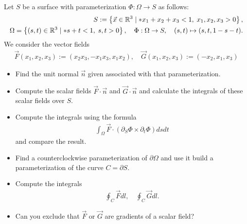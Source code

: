 \documentclass[11pt]{article}
\begin{document}
\begin{exercise}
    Let $S$ be a surface with parameterization $\Phi : \Omega \to S$ as follows:
    \begin{align}
     S := \left\{ \vec x \in \bbR^3 \suchthat* x_1 + x_2 + x_3 < 1, \; x_1, x_2, x_3 > 0 \right\},
     \\
     \Omega = \left\{ (s,t) \in \bbR^3 \suchthat* s + t < 1, \; s, t > 0 \right\},
     \quad 
     \Phi : \Omega \to S, \quad (s,t) \mapsto (s,t,1-s-t).
    \end{align}
    We consider the vector fields 
    \begin{align}
        \vec F(x_1,x_2,x_3) := (x_2 x_3, -x_1 x_3, x_1 x_2), \quad \vec G(x_1,x_2,x_3) := (-x_2, x_1,x_3)
    \end{align}
    \begin{itemize}
     \item
     Find the unit normal $\vec n$ given associated with that parameterization.
     \item
     Compute the scalar fields $\vec F \cdot \vec n$ and $\vec G \cdot \vec n$ and calculate the integrals of these scalar fields over $S$.
     \item
     Compute the integrals using the formula 
     \begin{align}
        \int_\Omega \vec F \cdot ( \partial_S \Phi \times \partial_t \Phi ) dsdt
     \end{align}
     and compare the result. 
     \item 
     Find a counterclockwise parameterization of $\partial\Omega$ and use it build a parameterization of the curve $C = \partial S$.
     \item 
     Compute the integrals 
     \begin{align}
        \oint_C \vec F dl, \quad \oint_C \vec G dl.
     \end{align}
     \item 
     Can you exclude that $\vec F$ or $\vec G$ are gradients of a scalar field?
    \end{itemize}
\end{exercise}
\end{document}
